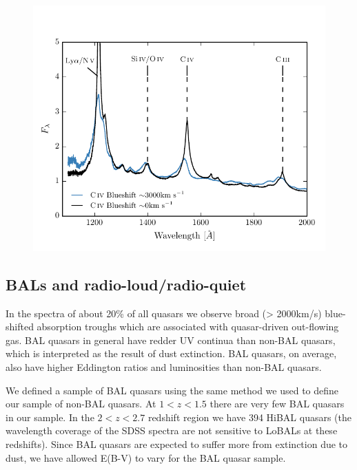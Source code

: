 \begin{figure}
\centering
  \includegraphics[width=\columnwidth]{figures/chapter05/blueshift_composite.pdf}
\caption{}
  \label{fig:}
\end{figure}

\subsection{BALs and radio-loud/radio-quiet}

In the spectra of about 20\% of all quasars we observe broad (> 2000km/s) blue-shifted absorption troughs which are associated with quasar-driven out-flowing gas. 
BAL quasars in general have redder UV continua than non-BAL quasars, which is interpreted as the result of dust extinction. 
BAL quasars, on average, also have higher Eddington ratios and luminosities than non-BAL quasars.

We defined a sample of BAL quasars using the same method we used to define our sample of non-BAL quasars. 
At $1 < z < 1.5$ there are very few BAL quasars in our sample. 
In the $2 < z < 2.7$ redshift region we have 394 HiBAL quasars (the wavelength coverage of the SDSS spectra are not sensitive to LoBALs at these redshifts). 
Since BAL quasars are expected to suffer more from extinction due to dust, we have allowed E(B-V) to vary for the BAL quasar sample. 

